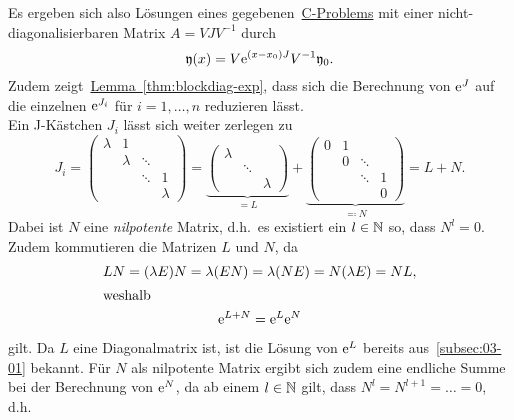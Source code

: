 Es ergeben sich also Lösungen eines gegebenen~\hyperref[eq:cp]{C-Problems} mit einer nicht-diagonalisierbaren Matrix $A = V J V^{-1}$ durch
\begin{equation*}
    \mathfrak{y}(x) = V \mathrm{e}^{(x - x_0) J} V^{-1} \mathfrak{y}_0.
\end{equation*}
Zudem zeigt~\hyperref[thm:blockdiag-exp]{Lemma~\ref*{thm:blockdiag-exp}},
dass sich die Berechnung von $\mathrm{e}^J$ auf die einzelnen $\mathrm{e}^{J_i}$ für $i = 1,\dots,n$ reduzieren lässt.\\
Ein J-Kästchen $J_i$ lässt sich weiter zerlegen zu
\begin{equation*}
    J_i = \begin{pmatrix}
              \lambda & 1       &        & \\
                      & \lambda & \ddots & \\
                      &         & \ddots & 1 \\
                      &         &        & \lambda
    \end{pmatrix}
    = \underbrace{\begin{pmatrix}
        \lambda &        & \\
                & \ddots & \\
                &        & \lambda
    \end{pmatrix}}_{= L}
    + \underbrace{\begin{pmatrix}
          0 & 1 &        & \\
            & 0 & \ddots & \\
            &   & \ddots & 1 \\
            &   &        & 0
    \end{pmatrix}}_{\eqqcolon N}
    = L + N.
\end{equation*}
Dabei ist $N$ eine \emph{nilpotente} Matrix, d.h.\ es existiert ein $l \in \mathbb{N}$ so, dass $N^l = 0$.
Zudem kommutieren die Matrizen $L$ und $N$, da
\begin{gather*}
    L N = (\lambda E) N = \lambda (EN) = \lambda (NE) = N (\lambda E) = N L,\\
    \intertext{weshalb}
    \mathrm{e}^{L + N} = \mathrm{e}^L \mathrm{e}^N
\end{gather*}
gilt.
Da $L$ eine Diagonalmatrix ist, ist die Lösung von $\mathrm{e}^L$ bereits aus~\autoref{subsec:03-01} bekannt.
Für $N$ als nilpotente Matrix ergibt sich zudem eine endliche Summe bei der Berechnung von $\mathrm{e}^N$,
da ab einem $l \in \mathbb{N}$ gilt, dass $N^l = N^{l+1} = \dots = 0$, d.h.
